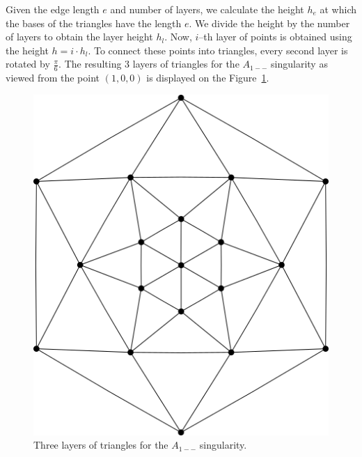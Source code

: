 Given the edge length $e$ and number of layers, we calculate the height $h_e$ 
at which the bases of the triangles
have the length $e$. We divide the height by the number of layers to obtain the
layer height $h_l$. Now, $i$--th layer of points is obtained using the height
$h = i\cdot h_l$. To connect these points into triangles, every second
layer is rotated by $\frac{\pi}{6}$. The resulting 3 layers of triangles
for the $A_{1--}$ singularity as viewed from the point $(1, 0, 0)$ is displayed on
the Figure~\ref{img:52}. 

\begin{figure}
    \centerline{\includegraphics[scale=0.5]{images/img52}}
    \caption[Three layers of triangles for the $A_{1--}$ singularity]
    {Three layers of triangles for the $A_{1--}$ singularity.}
    \label{img:52}
\end{figure}

